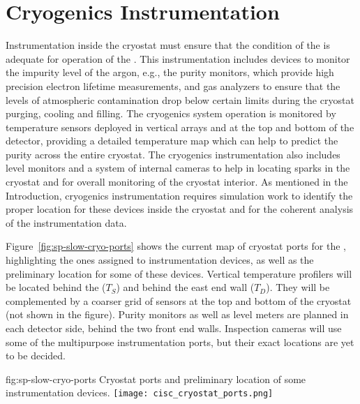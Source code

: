 \section{Cryogenics Instrumentation}
\label{sec:fdsp-cryo-instr} %
\label{sec:fddp-cryo-instr} %
\label{sec:fdgen-cryo-instr} %

Instrumentation inside the cryostat must ensure that the condition of the  is adequate for operation of the .
This instrumentation includes devices to monitor the impurity level of the argon, e.g., the purity monitors, which provide high precision electron lifetime measurements,
and gas analyzers to ensure that the levels of atmospheric contamination drop below certain limits during the cryostat purging, cooling and filling.
The cryogenics system operation is monitored by temperature sensors deployed in vertical arrays and at the top and bottom of the detector, providing a 
detailed \threed temperature map which can help to predict the  purity across the entire cryostat. The cryogenics instrumentation also includes \lar level monitors and
a system of internal cameras to help in locating sparks in the cryostat and for overall monitoring of the cryostat interior. 
As mentioned in the Introduction, cryogenics instrumentation requires simulation work to identify the proper location for these devices inside the cryostat and
for the coherent analysis of the instrumentation data. 

Figure~\ref{fig:sp-slow-cryo-ports} shows the current map of cryostat ports for the , highlighting the ones assigned to instrumentation devices,
as well as the preliminary location for some of these devices. Vertical temperature profilers will be located behind the  ($T_S$) and behind the east end wall ($T_D$).
They will be complemented by a coarser \twod grid of sensors at the top and bottom of the cryostat (not shown in the figure). Purity monitors as well as level meters are planned
in each detector side, behind the two front end walls. Inspection cameras will use some of the multipurpose instrumentation ports, but their exact locations are yet to be decided. 

\begin{dunefigure}{fig:sp-slow-cryo-ports}
{Cryostat ports and preliminary location of some instrumentation devices. }
\texttt{[image: cisc\_cryostat\_ports.png]}
\end{dunefigure}




